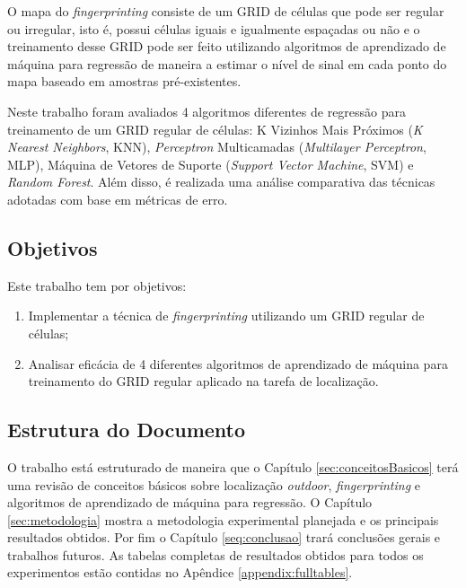 \documentclass[12pt]{article}
\begin{document}
    O mapa do \textit{fingerprinting} consiste de um GRID de células que pode ser regular ou irregular, isto é, possui células iguais e igualmente espaçadas ou não e o treinamento desse GRID pode ser feito utilizando algoritmos de aprendizado de máquina para regressão de maneira a estimar o nível de sinal em cada ponto do mapa baseado em amostras pré-existentes.
        
    Neste trabalho foram avaliados 4 algoritmos diferentes de regressão para treinamento de um GRID regular de células: K Vizinhos Mais Próximos (\textit{K Nearest Neighbors}, KNN), \textit{Perceptron} Multicamadas (\textit{Multilayer Perceptron}, MLP), Máquina de Vetores de Suporte (\textit{Support Vector Machine}, SVM) e \textit{Random Forest}. Além disso, é realizada uma análise comparativa das técnicas adotadas com base em métricas de erro.
    
        \subsection{Objetivos}
        \label{sec:objetivos}
    
        Este trabalho tem por objetivos:
        
        \begin{enumerate}
            \item Implementar a técnica de \textit{fingerprinting} utilizando um GRID regular de células;
            
            \item Analisar eficácia de 4 diferentes algoritmos de aprendizado de máquina para treinamento do GRID regular aplicado na tarefa de localização.
        \end{enumerate}
    
        \subsection{Estrutura do Documento}
        \label{sec:estruturaDocumento}
    
        O trabalho está estruturado de maneira que o Capítulo \ref{sec:conceitosBasicos} terá uma revisão de conceitos básicos sobre localização \textit{outdoor}, \textit{fingerprinting} e algoritmos de aprendizado de máquina para regressão. O Capítulo \ref{sec:metodologia} mostra a metodologia experimental planejada e os principais resultados obtidos. Por fim o Capítulo \ref{seq:conclusao} trará conclusões gerais e trabalhos futuros. As tabelas completas de resultados obtidos para todos os experimentos estão contidas no Apêndice \ref{appendix:fulltables}.
\end{document}
